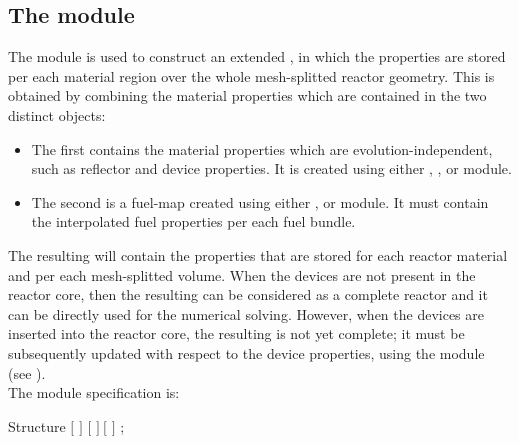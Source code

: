 \subsection{The  module}\label{sect:macini}

\vskip 0.2cm
The  module is used to construct an extended ,
in which the properties are stored per each material region over the whole
mesh-splitted reactor geometry. This  is obtained by combining
the material properties which are contained in the two distinct 
objects:

\begin{itemize}
\item The first  contains the material properties which are
evolution-independent, such as reflector and device properties. It is created
using either , ,  or  module.
\item The second is a fuel-map  created using either ,
 or  module. It must contain the interpolated fuel properties per
each fuel bundle.
\end{itemize}

The resulting  will contain the properties that are stored for each
reactor material and per each mesh-splitted volume. When the devices are not
present in the reactor core, then the resulting  can be considered
as a complete reactor  and it can be directly used for the numerical
solving. However, when the devices are inserted into the reactor core, the resulting
 is not yet complete; it must be subsequently updated with respect
to the device properties, using the  module (see ).\\

\noindent
The  module specification is:

\begin{DataStructure}{Structure }
  \moc{:=} 
  $[$   $]$ \moc{::}
$[$   $]~[$  $]$ ;
\end{DataStructure}

